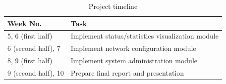 \documentclass{sig-alternate-05-2015}
\begin{document}
	\begin{table}[h]
		\centering
		\caption{Project timeline}
		\label{table:timeline}
		\begin{tabular}{p{3cm}|p{5cm}} \hline
			Week No. & Task \\ \hline
			5, 6 (first half) & Implement status/statistics visualization module \\ \hline
			6 (second half), 7 & Implement network configuration module \\ \hline
			8, 9 (first half) & Implement system administration module \\ \hline
			9 (second half), 10 & Prepare final report and presentation \\
			\hline\end{tabular}
	\end{table}
	
  
  
\end{document}
